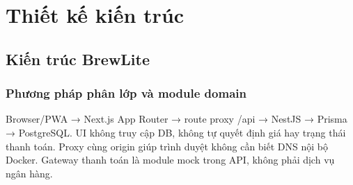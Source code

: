 \documentclass[a4paper,12pt,oneside]{report}
\begin{document}
\chapter{Thiết kế kiến trúc}

\section{Kiến trúc BrewLite}

\subsection{Phương pháp phân lớp và module domain}
Browser/\allowbreak{}PWA → Next.js App Router → route proxy /\allowbreak{}api → NestJS → Prisma → PostgreSQL. UI không truy cập DB, không tự quyết định giá hay trạng thái thanh toán. Proxy cùng origin giúp trình duyệt không cần biết DNS nội bộ Docker. Gateway thanh toán là module mock trong API, không phải dịch vụ ngân hàng.
\end{document}

